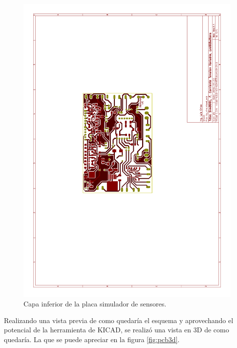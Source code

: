 \begin{figure}[!hp]
  \centering
  \includegraphics[page=2,angle=270,clip,trim=5.5cm 10cm 7.7cm 8.5cm]{./Figures/pcb_layer.pdf}
  \caption{Capa inferior de la placa simulador de sensores.}
  \label{fig:layer_inf}
\end{figure}

Realizando una vista previa de como quedaría el esquema y aprovechando el potencial de la herramienta de KICAD, se realizó una vista en 3D de como quedaría. La que se puede apreciar en la figura \ref{fig:pcb3d}.

